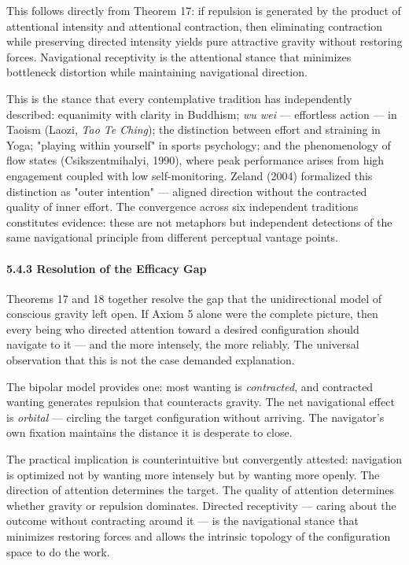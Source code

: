 This follows directly from Theorem 17: if repulsion is generated by the product of attentional intensity and attentional contraction, then eliminating contraction while preserving directed intensity yields pure attractive gravity without restoring forces. Navigational receptivity is the attentional stance that minimizes bottleneck distortion while maintaining navigational direction.


This is the stance that every contemplative tradition has independently described: equanimity with clarity in Buddhism; \textit{wu wei} — effortless action — in Taoism (Laozi, \textit{Tao Te Ching}); the distinction between effort and straining in Yoga; "playing within yourself" in sports psychology; and the phenomenology of flow states (Csikszentmihalyi, 1990), where peak performance arises from high engagement coupled with low self-monitoring. Zeland (2004) formalized this distinction as "outer intention" — aligned direction without the contracted quality of inner effort. The convergence across six independent traditions constitutes evidence: these are not metaphors but independent detections of the same navigational principle from different perceptual vantage points.


\paragraph*{5.4.3 Resolution of the Efficacy Gap}


Theorems 17 and 18 together resolve the gap that the unidirectional model of conscious gravity left open. If Axiom 5 alone were the complete picture, then every being who directed attention toward a desired configuration should navigate to it — and the more intensely, the more reliably. The universal observation that this is not the case demanded explanation.


The bipolar model provides one: most wanting is \textit{contracted}, and contracted wanting generates repulsion that counteracts gravity. The net navigational effect is \textit{orbital} — circling the target configuration without arriving. The navigator's own fixation maintains the distance it is desperate to close.


The practical implication is counterintuitive but convergently attested: navigation is optimized not by wanting more intensely but by wanting more openly. The direction of attention determines the target. The quality of attention determines whether gravity or repulsion dominates. Directed receptivity — caring about the outcome without contracting around it — is the navigational stance that minimizes restoring forces and allows the intrinsic topology of the configuration space to do the work.


